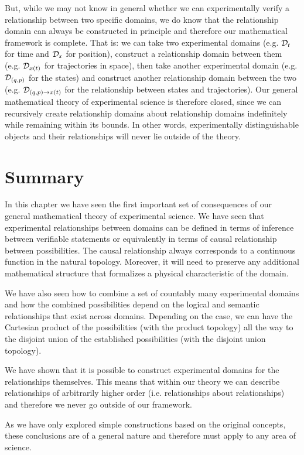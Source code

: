 But, while we may not know in general whether we can experimentally verify a relationship between two specific domains, we do know that the relationship domain can always be constructed in principle and therefore our mathematical framework is complete. That is: we can take two experimental domains (e.g. $\mathcal{D}_t$ for time and $\mathcal{D}_x$ for position), construct a relationship domain between them (e.g. $\mathcal{D}_{x(t)}$ for trajectories in space), then take another experimental domain (e.g. $\mathcal{D}_{(q,p)}$ for the states) and construct another relationship domain between the two (e.g. $\mathcal{D}_{(q,p)\to x(t)}$ for the relationship between states and trajectories). Our general mathematical theory of experimental science is therefore closed, since we can recursively create relationship domains about relationship domains indefinitely while remaining within its bounds. In other words, experimentally distinguishable objects and their relationships will never lie outside of the theory.


\section{Summary}

In this chapter we have seen the first important set of consequences of our general mathematical theory of experimental science. We have seen that experimental relationships between domains can be defined in terms of inference between verifiable statements or equivalently in terms of causal relationship between possibilities. The causal relationship always corresponds to a continuous function in the natural topology. Moreover, it will need to preserve any additional mathematical structure that formalizes a physical characteristic of the domain.

We have also seen how to combine a set of countably many experimental domains and how the combined possibilities depend on the logical and semantic relationships that exist across domains. Depending on the case, we can have the Cartesian product of the possibilities (with the product topology) all the way to the disjoint union of the established possibilities (with the disjoint union topology).

We have shown that it is possible to construct experimental domains for the relationships themselves. This means that within our theory we can describe relationships of arbitrarily higher order (i.e. relationships about relationships) and therefore we never go outside of our framework.

As we have only explored simple constructions based on the original concepts, these conclusions are of a general nature and therefore must apply to any area of science. 
